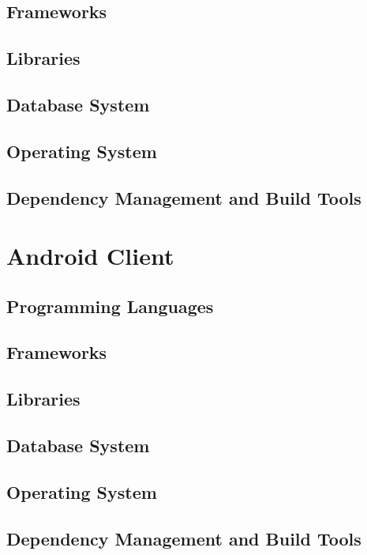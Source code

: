 \documentclass[11pt,fleqn]{book} %
\begin{document}
	\subsection{Frameworks}
	\subsection{Libraries}
	\subsection{Database System}
	\subsection{Operating System}
	\subsection{Dependency Management and Build Tools}
	\section{Android Client}
	\subsection{Programming Languages}
	\subsection{Frameworks}
	\subsection{Libraries}
	\subsection{Database System}
	\subsection{Operating System}
	\subsection{Dependency Management and Build Tools}	
	
	
	
	
\end{document}
